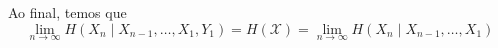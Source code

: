 \begin{frame}[allowframebreaks]
  \framebreak

  Ao final, temos que
  \begin{equation}
  \lim_{n \rightarrow \infty} H(X_n \mid X_{n-1}, \ldots, X_1, Y_1) = H(\mathcal{X}) = \lim_{n \rightarrow \infty} H(X_n \mid X_{n-1}, \ldots, X_1)
  \end{equation}
\end{frame}

